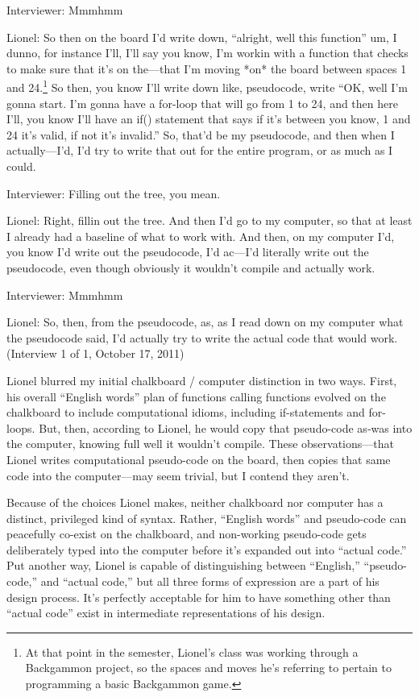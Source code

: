 Interviewer: Mmmhmm

Lionel: So then on the board I'd write down, ``alright, well this
function'' um, I dunno, for instance I'll, I'll say you know, I'm workin
with a function that checks to make sure that it's on the---that I'm
moving *on* the board between spaces 1 and 24.\footnote{At that point in
  the semester, Lionel's class was working through a Backgammon project,
  so the spaces and moves he's referring to pertain to programming a
  basic Backgammon game.} So then, you know I'll write down like,
pseudocode, write ``OK, well I'm gonna start. I'm gonna have a for-loop
that will go from 1 to 24, and then here I'll, you know I'll have an
if() statement that says if it's between you know, 1 and 24 it's valid,
if not it's invalid.'' So, that'd be my pseudocode, and then when I
actually---I'd, I'd try to write that out for the entire program, or as
much as I could.

Interviewer: Filling out the tree, you mean.

Lionel: Right, fillin out the tree. And then I'd go to my computer, so
that at least I already had a baseline of what to work with. And then,
on my computer I'd, you know I'd write out the pseudocode, I'd ac---I'd
literally write out the pseudocode, even though obviously it wouldn't
compile and actually work.

Interviewer: Mmmhmm

Lionel: So, then, from the pseudocode, as, as I read down on my computer
what the pseudocode said, I'd actually try to write the actual code that
would work. (Interview 1 of 1, October 17, 2011)

Lionel blurred my initial chalkboard / computer distinction in two ways.
First, his overall ``English words'' plan of functions calling functions
evolved on the chalkboard to include computational idioms, including
if-statements and for-loops. But, then, according to Lionel, he would
copy that pseudo-code as-was into the computer, knowing full well it
wouldn't compile. These observations---that Lionel writes computational
pseudo-code on the board, then copies that same code into the
computer---may seem trivial, but I contend they aren't.

Because of the choices Lionel makes, neither chalkboard nor computer has
a distinct, privileged kind of syntax. Rather, ``English words'' and
pseudo-code can peacefully co-exist on the chalkboard, and non-working
pseudo-code gets deliberately typed into the computer before it's
expanded out into ``actual code.'' Put another way, Lionel is capable of
distinguishing between ``English,'' ``pseudo-code,'' and ``actual
code,'' but all three forms of expression are a part of his design
process. It's perfectly acceptable for him to have something other than
``actual code'' exist in intermediate representations of his design.

